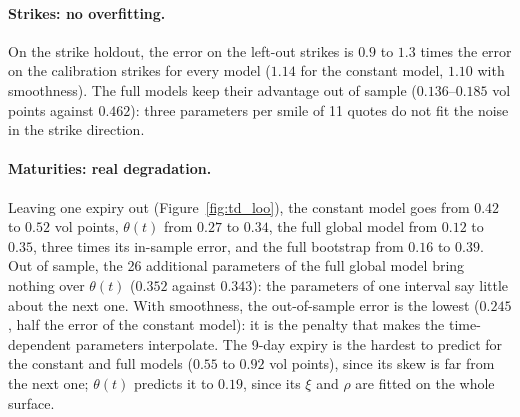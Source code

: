 \documentclass[11pt,a4paper]{article}
\theoremstyle{plain}
\theoremstyle{definition}
\begin{document}
\begin{table}[htbp]
\centering
\small
{}
\caption{Out-of-sample and stability tests (implied volatility RMSE in vol points). Displacement: RMSE between the implied volatilities of the model calibrated on noisy quotes and on the original quotes.}
\label{tab:td_validation}
\end{table}

\paragraph{Strikes: no overfitting.} On the strike holdout, the error on the left-out strikes is $0.9$ to $1.3$ times the error on the calibration strikes for every model ($1.14$ for the constant model, $1.10$ with smoothness). The full models keep their advantage out of sample ($0.136$--$0.185$ vol points against $0.462$): three parameters per smile of 11 quotes do not fit the noise in the strike direction.

\paragraph{Maturities: real degradation.} Leaving one expiry out (Figure~\ref{fig:td_loo}), the constant model goes from $0.42$ to $0.52$ vol points, $\theta(t)$ from $0.27$ to $0.34$, the full global model from $0.12$ to $0.35$, three times its in-sample error, and the full bootstrap from $0.16$ to $0.39$. Out of sample, the 26 additional parameters of the full global model bring nothing over $\theta(t)$ ($0.352$ against $0.343$): the parameters of one interval say little about the next one. With smoothness, the out-of-sample error is the lowest ($0.245$, half the error of the constant model): it is the penalty that makes the time-dependent parameters interpolate. The 9-day expiry is the hardest to predict for the constant and full models ($0.55$ to $0.92$ vol points), since its skew is far from the next one; $\theta(t)$ predicts it to $0.19$, since its $\xi$ and $\rho$ are fitted on the whole surface.
\end{document}
